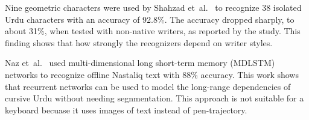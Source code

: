\documentclass[12pt,a4paper]{report}
\begin{document}
Nine geometric characters were used by Shahzad et~al.\ \cite{shahzad} to recognize 38 isolated Urdu characters with an accuracy of 92.8\%. The accuracy dropped sharply, to about 31\%, when tested with non-native writers, as reported by the study. This finding shows that how strongly the recognizers depend on writer styles.

Naz et~al.\ \cite{naz2014} used multi-dimensional long short-term memory (MDLSTM) networks to recognize offline Nastaliq text with 88\% accuracy. This work shows that recurrent networks can be used to model the long-range dependencies of cursive Urdu without needing segnmentation. This approach is not suitable for a keyboard becuase it uses images of text instead of pen-trajectory.
\end{document}
